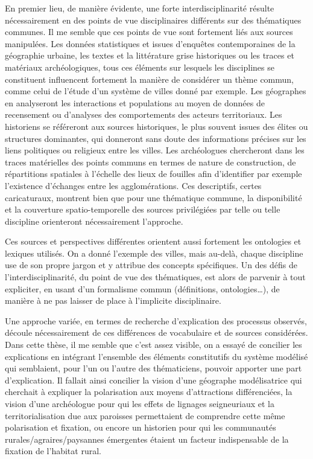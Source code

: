 En premier lieu, de manière évidente, une forte interdisciplinarité résulte nécessairement en des points de vue disciplinaires différents sur des thématiques communes.
Il me semble que ces points de vue sont fortement liés aux sources manipulées.
Les données statistiques et issues d'enquêtes contemporaines de la géographie urbaine, les textes et la littérature grise historiques ou les traces et matériaux archéologiques, tous ces éléments sur lesquels les disciplines se constituent influencent fortement la manière de considérer un thème commun, comme celui de l'étude d'un système de villes donné par exemple.
Les géographes en analyseront les interactions et populations au moyen de données de recensement ou d'analyses des comportements des acteurs territoriaux.
Les historiens se référeront aux sources historiques, le plus souvent issues des élites ou structures dominantes, qui donneront sans doute des informations précises sur les liens politiques ou religieux entre les villes.
Les archéologues chercheront dans les traces matérielles des points communs en termes de nature de construction, de répartitions spatiales à l'échelle des lieux de fouilles afin d'identifier par exemple l'existence d'échanges entre les agglomérations.
Ces descriptifs, certes caricaturaux, montrent bien que pour une thématique commune, la disponibilité et la couverture spatio-temporelle des sources privilégiées par telle ou telle discipline orienteront nécessairement l'approche.

Ces sources et perspectives différentes orientent aussi fortement les ontologies et lexiques utilisés.
On a donné l'exemple des villes, mais au-delà, chaque discipline use de son propre jargon et y attribue des concepts spécifiques.
Un des défis de l'interdisciplinarité, du point de vue des thématiques, est alors de parvenir à tout expliciter, en usant d'un formalisme commun (définitions, ontologies\ldots), de manière à ne pas laisser de place à l'implicite disciplinaire.

Une approche variée, en termes de recherche d'explication des processus observés, découle nécessairement de ces différences de vocabulaire et de sources considérées.
Dans cette thèse, il me semble que c'est assez visible, on a essayé de concilier les explications en intégrant l'ensemble des éléments constitutifs du système modélisé qui semblaient, pour l'un ou l'autre des thématiciens, pouvoir apporter une part d'explication.
Il fallait ainsi concilier la vision d'une géographe modélisatrice qui cherchait à expliquer la polarisation aux moyens d'attractions différenciées, la vision d'une archéologue pour qui les effets de lignages seigneuriaux et la territorialisation due aux paroisses permettaient de comprendre cette même polarisation et fixation, ou encore un historien pour qui les communautés rurales/agraires/paysannes émergentes étaient un facteur indispensable de la fixation de l'habitat rural.

